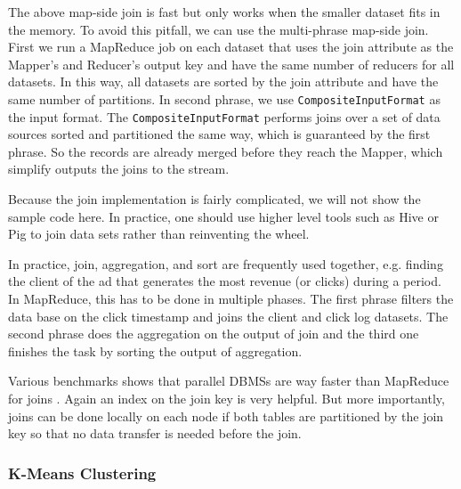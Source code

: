 \documentclass[12pt]{book}
\begin{document}
The above map-side join is fast but only works when the smaller dataset fits in the memory. To avoid this pitfall, we can use the multi-phrase map-side join. First we run a MapReduce job on each dataset that uses the join attribute as the Mapper's and Reducer's output key and have the same number of reducers for all datasets. In this way, all datasets are sorted by the join attribute and have the same number of partitions. In second phrase, we use \texttt{CompositeInputFormat} as the input format. The \texttt{CompositeInputFormat} performs joins over a set of data sources sorted and partitioned the same way, which is guaranteed by the first phrase. So the records are already merged before they reach the Mapper, which simplify outputs the joins to the stream.

Because the join implementation is fairly complicated, we will not show the sample code here. In practice, one should use higher level tools such as Hive or Pig to join data sets rather than reinventing the wheel.

In practice, join, aggregation, and sort are frequently used together, e.g. finding the client of the ad that generates the most revenue (or clicks) during a period. In MapReduce, this has to be done in multiple phases. The first phrase filters the data base on the click timestamp and joins the client and click log datasets. The second phrase does the aggregation on the output of join and the third one finishes the task by sorting the output of aggregation. 

Various benchmarks shows that parallel DBMSs are way faster than MapReduce for joins \cite{Pavlo:2009:CAL}. Again an index on the join key is very helpful. But more importantly, joins can be done locally on each node if both tables are partitioned by the join key so that no data transfer is needed before the join.

\subsubsection{K-Means Clustering}
\end{document}

